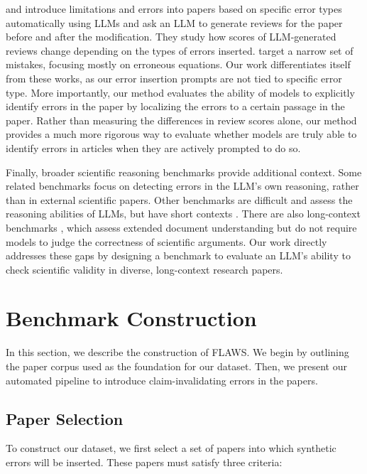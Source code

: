 \documentclass{article}
\newcommand{\benchmark}{FLAWS}
\begin{document}
\citet{tyser2024} and \citet{li2025} introduce limitations and errors into papers based on specific error types automatically using LLMs and ask an LLM to generate reviews for the paper before and after the modification. They study how scores of LLM-generated reviews change depending on the types of errors inserted. \citet{lou2025} target a narrow set of mistakes, focusing mostly on erroneous equations. Our work differentiates itself from these works, as our error insertion prompts are not tied to specific error type. More importantly, our method evaluates the ability of models to explicitly identify errors in the paper by localizing the errors to a certain passage in the paper. Rather than measuring the differences in review scores alone, our method provides a much more rigorous way to evaluate whether models are truly able to identify errors in articles when they are actively prompted to do so.

Finally, broader scientific reasoning benchmarks provide additional context. Some related benchmarks \citep{kamoi2024evaluating} focus on detecting errors in the LLM's own reasoning, rather than in external scientific papers. Other benchmarks are difficult and assess the reasoning abilities of LLMs, but have short contexts \citep{phan2025, ye2025aimepreview}. There are also long-context benchmarks \citep{ling2025, bai2025}, which assess extended document understanding but do not require models to judge the correctness of scientific arguments. Our work directly addresses these gaps by designing a benchmark to evaluate an LLM's ability to check scientific validity in diverse, long-context research papers.
 
\section{Benchmark Construction}
In this section, we describe the construction of \benchmark{}. We begin by outlining the paper corpus used as the foundation for our dataset. Then, we present our automated pipeline to introduce claim-invalidating errors in the papers.
\subsection{Paper Selection}
To construct our dataset, we first select a set of papers into which synthetic errors will be inserted. These papers must satisfy three criteria:
\end{document}
